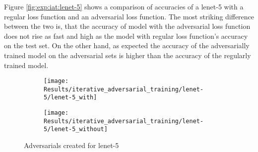 \documentclass[draft,final]{vutinfth} %
\begin{document}
\begin{table}[h]
	\noindent{}
		\caption{Accuracies in the last epoch for undefended and adversarial loss}
\end{table}

Figure \ref{fig:exp:iat:lenet-5} shows a comparison of accuracies of a lenet-5 with a regular loss function and an adversarial loss function.
The most striking difference between the two is, that the accuracy of model with the adversarial loss function does not rise as fast and high as the model with regular loss function's accuracy on the test set.
On the other hand, as expected the accuracy of the adversarially trained model on the adversarial sets is higher than the accuracy of the regularly trained model.

\begin{figure}[h]
	\centering
  \begin{subfigure}[b]{1\columnwidth}
    \label{fig:exp:iat:lenet-5:adversarials:with}
		\texttt{[image: Results/iterative\_adversarial\_training/lenet-5/lenet-5\_with]}
		\vspace{15mm}
  \end{subfigure}
  \begin{subfigure}[b]{1\columnwidth}
    \label{fig:exp:iat:lenet-5:adversarials:without}
		\texttt{[image: Results/iterative\_adversarial\_training/lenet-5/lenet-5\_without]}
  \end{subfigure}
  \caption{Adversarials created for lenet-5}
	\label{fig:exp:iat:lenet-5:adversarials}
\end{figure}
\end{document}
